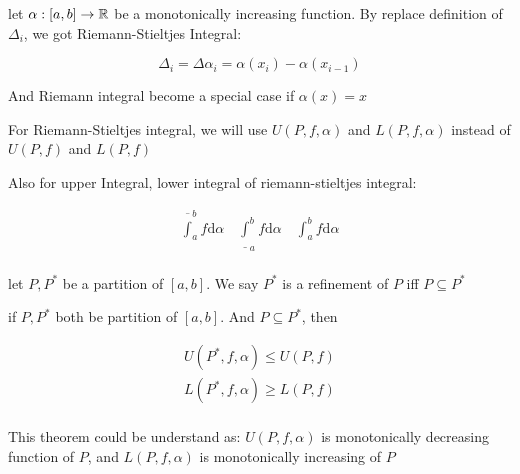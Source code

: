 \begin{definition}
    let $\alpha: [a,b] \to \mathbb{R}$ be a monotonically increasing function. By replace definition of $\Delta_i$, we got 
    Riemann-Stieltjes Integral:

    \[
        \Delta_i = \Delta \alpha_i = \alpha(x_i) - \alpha(x_{i-1})
    \]

    And Riemann integral become a special case if $\alpha(x) = x$

    For Riemann-Stieltjes integral, we will use $U(P,f,\alpha)$ and $L(P,f,\alpha)$ instead of $U(P,f)$ and $L(P,f)$

    Also for upper Integral, lower integral of riemann-stieltjes integral:

    \begin{align*}
        \overline{\int}_a^b f \mathrm{d} \alpha \quad \underline{\int}_a^b f \mathrm{d} \alpha 
        \quad \int_a^b f \mathrm{d} \alpha \\
    \end{align*}
\end{definition}

\begin{definition}[Refinement]
    let $P, P^*$ be a partition of $[a,b]$. We say $P^*$ is a refinement of $P$ iff $P \subseteq P^*$
\end{definition}

\begin{thm}
    if $P, P^*$ both be partition of $[a,b]$. And $P \subseteq P^*$, then

    \begin{align*}
       U(P^*,f, \alpha) \le U(P,f) \\
       L(P^*,f, \alpha) \ge L(P,f) \\
    \end{align*}

    This theorem could be understand as: $U(P, f, \alpha)$ is monotonically decreasing function of $P$, 
    and $L(P, f, \alpha)$ is monotonically increasing of $P$
\end{thm}

